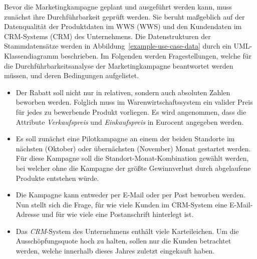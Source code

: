 \documentclass[
  language=german, %
  type=bachelor%
]{isthesis}
\begin{document}
\begin{content}
  Bevor die Marketingkampagne geplant und ausgeführt werden kann, muss zunächst
  ihre Durchführbarkeit geprüft werden. Sie beruht maßgeblich auf der
  Datenqualität der Produktdaten im \acrlong{WWS} (\acrshort{WWS}) und den
  Kundendaten im \acrlong{CRM}-Systems (\acrshort{CRM}) des Unternehmens. Die
  Datenstrukturen der Stammdatensätze werden in
  Abbildung~\ref{example-use-case-data} durch ein UML-Klassendiagramm
  beschrieben. Im Folgenden werden Fragestellungen, welche für die
  Durchführbarkeitsanalyse der Marketingkampagne beantwortet werden müssen, und
  deren Bedingungen aufgelistet.

  \begin{figure}[caption={Datenstruktur des Produkt- und Kundenstammdatensatzes}, label={example-use-case-data}]
    \resizebox{250pt}{!}{}
  \end{figure}

  \begin{itemize}

    \item Der Rabatt soll nicht nur in relativen, sondern auch absoluten Zahlen
      beworben werden. Folglich muss im Warenwirtschaftssystem ein valider
      Preis für jedes zu bewerbende Produkt vorliegen. Es wird angenommen, dass
      die Attribute \textit{Verkaufspreis} und \textit{Einkaufspreis} in
      Eurocent angegeben werden.

    \item Es soll zunächst eine Pilotkampagne an einem der beiden Standorte im
      nächsten (Oktober) oder übernächsten (November) Monat gestartet werden.
      Für diese Kampagne soll die Standort-Monat-Kombination gewählt werden,
      bei welcher ohne die Kampagne der größte Gewinnverlust durch abgelaufene
      Produkte entstehen würde.

    \item Die Kampagne kann entweder per E-Mail oder per Post beworben werden.
      Nun stellt sich die Frage, für wie viele Kunden im \acrshort{CRM}-System
      eine E-Mail-Adresse und für wie viele eine Postanschrift hinterlegt ist.

    \item Das \textit{CRM}-System des Unternehmens enthält viele Karteileichen.
      Um die Ausschöpfungsquote hoch zu halten, sollen nur die Kunden
      betrachtet werden, welche innerhalb dieses Jahres zuletzt eingekauft
      haben.

  \end{itemize}


\end{content}
\end{document}
